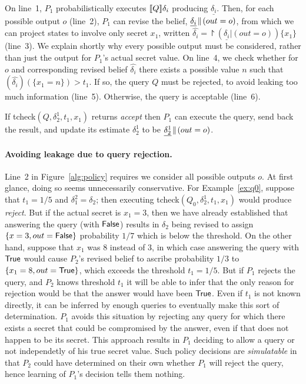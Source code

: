 \documentclass[10pt]{sigplanconf}
\newcommand{\polc}{\textsf{tcheck}}
\begin{document}
On line~1, $P_1$ probabilistically executes $[\![{Q}]\!]{\delta}_i$
producing $\underline{\delta_i}$.
Then, for each possible output $o$ (line~2), $P_1$ can revise the
belief, $\underline{\delta_i}\!\parallel\!{(out = o)}$, from which we can
project states to involve only secret $x_1$, written $\hat{\delta_i} =
\project{(\underline{\delta_i} | (out = o))}{\{x_1\}}$ (line~3). We
explain shortly why every possible output must be considered, rather
than just the output for $P_1$'s actual secret value.  On line~4, we
check whether for $o$ and corresponding revised belief $\hat{\delta_i}$ there
exists a possible value $n$ such that $(\hat{\delta_i})(\{x_1 = n \}) >
t_1$.  If so, the query $Q$ must be rejected, to avoid leaking
too much information (line~5).  Otherwise, the query is acceptable
(line~6).

If \polc$(Q,\delta^1_2,t_1,x_1)$ returns \emph{accept} then $P_1$ can
execute the query, send back the result, and update its estimate
$\delta_2^1$ to be $\underline{\delta_2^1}\!\parallel\!{(out = o)}$.

\paragraph*{Avoiding leakage due to query rejection.}
Line~2 in Figure~\ref{alg:policy} requires we consider all possible
outputs $o$.  At first glance, doing so seems unnecessarily
conservative.  For Example~\ref{ex:q0}, suppose that $t_1 = 1/5$ and
$\delta^2_1 = \delta_2$; then executing
\polc$(Q_0,\delta^1_2,t_1,x_1)$ would produce \emph{reject}.  But if
the actual secret is $x_1 = 3$, then we have already established that
answering the query (with $\mathsf{False}$) results in $\delta_2$ being
revised to assign $\{ x=3, out=\mathsf{False} \}$ probability $1/7$ which is
below the threshold.  On the other hand, suppose that $x_1$ was $8$
instead of $3$, in which case answering the query with $\mathsf{True}$ would
cause $P_2$'s revised belief to ascribe probability $1/3$ to $\{ x_1 =
8, out = \mathsf{True} \}$, which exceeds the threshold $t_1 = 1/5$. But if
$P_1$ rejects the query, and $P_2$ knows threshold $t_1$ it will be
able to infer that the only reason for rejection would be that the answer would
have been $\mathsf{True}$.  Even if $t_1$ is not known directly, it can be
inferred by enough queries to eventually make this sort of
determination.  $P_1$ avoids this situation by rejecting any query
for which there exists a secret that could be compromised by the
answer, even if that does not happen to be its secret. This approach
results in $ P_1 $ deciding to allow a query or not independetly of
his true secret value. Such policy decisions are \emph{simulatable}
\cite{kenthapadi05simulatable} in that $ P_2 $ could have determined
on their own whether $ P_1 $ will reject the query, hence learning of
$ P_1 $'s decision tells them nothing.
\end{document}
